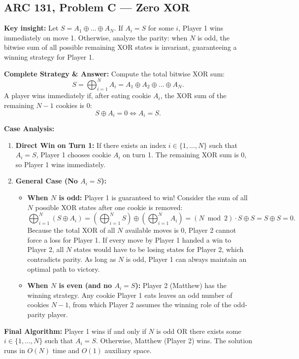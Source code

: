 \documentclass[12pt]{article}
\newcommand{\insight}[1]{\par\medskip\noindent\textbf{Key insight:} #1}
\begin{document}
\subsection{ARC 131, Problem C --- Zero XOR}

\insight{Let $S = A_1 \oplus \dots \oplus A_N$. If $A_i = S$ for some $i$, Player 1 wins immediately on move 1. Otherwise, analyze the parity: when $N$ is odd, the bitwise sum of all possible remaining XOR states is invariant, guaranteeing a winning strategy for Player 1.}

\textbf{Complete Strategy \& Answer:}
Compute the total bitwise XOR sum:
\[
S = \bigoplus_{i=1}^N A_i = A_1 \oplus A_2 \oplus \dots \oplus A_N.
\]
A player wins immediately if, after eating cookie $A_i$, the XOR sum of the remaining $N-1$ cookies is 0:
\[
S \oplus A_i = 0 \iff A_i = S.
\]

\textbf{Case Analysis:}
\begin{enumerate}
    \item \textbf{Direct Win on Turn 1:}
    If there exists an index $i \in \{1, \dots, N\}$ such that $A_i = S$, Player 1 chooses cookie $A_i$ on turn 1. The remaining XOR sum is 0, so Player 1 wins immediately.

    \item \textbf{General Case (No $A_i = S$):}
    \begin{itemize}
        \item \textbf{When $N$ is odd:}
        Player 1 is guaranteed to win!
        Consider the sum of all $N$ possible XOR states after one cookie is removed:
        \[
        \bigoplus_{i=1}^N (S \oplus A_i) = \left( \bigoplus_{i=1}^N S \right) \oplus \left( \bigoplus_{i=1}^N A_i \right) = (N \bmod 2) \cdot S \oplus S = S \oplus S = 0.
        \]
        Because the total XOR of all $N$ available moves is 0, Player 2 cannot force a loss for Player 1. If every move by Player 1 handed a win to Player 2, all $N$ states would have to be losing states for Player 2, which contradicts parity. As long as $N$ is odd, Player 1 can always maintain an optimal path to victory.

        \item \textbf{When $N$ is even (and no $A_i = S$):}
        Player 2 (Matthew) has the winning strategy. Any cookie Player 1 eats leaves an odd number of cookies $N - 1$, from which Player 2 assumes the winning role of the odd-parity player.
    \end{itemize}
\end{enumerate}
\textbf{Final Algorithm:}
Player 1 wins if and only if $N$ is odd OR there exists some $i \in \{1, \dots, N\}$ such that $A_i = S$. Otherwise, Matthew (Player 2) wins. The solution runs in $O(N)$ time and $O(1)$ auxiliary space.
\end{document}
